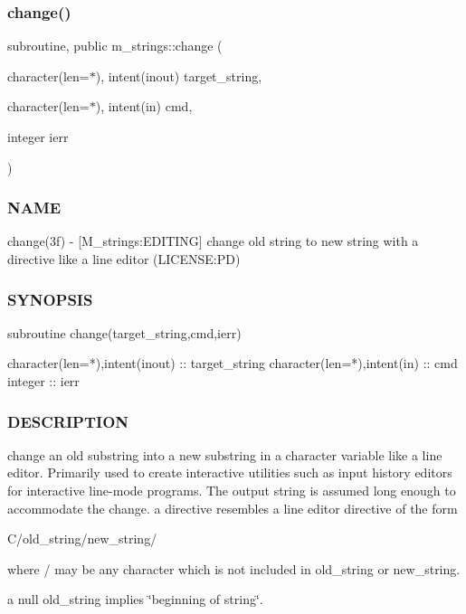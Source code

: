 \subsubsection{\texorpdfstring{change()}{change()}}
{\footnotesize\ttfamily subroutine, public m\+\_\+strings\+::change (\begin{DoxyParamCaption}\item[{character(len=$\ast$), intent(inout)}]{target\+\_\+string,  }\item[{character(len=$\ast$), intent(in)}]{cmd,  }\item[{integer}]{ierr }\end{DoxyParamCaption})}



\subsubsection*{N\+A\+ME}

change(3f) -\/ \mbox{[}M\+\_\+strings\+:E\+D\+I\+T\+I\+NG\mbox{]} change old string to new string with a directive like a line editor (L\+I\+C\+E\+N\+SE\+:PD) 

\subsubsection*{S\+Y\+N\+O\+P\+S\+IS}

\begin{DoxyVerb}subroutine change(target_string,cmd,ierr)

 character(len=*),intent(inout) :: target_string
 character(len=*),intent(in)    :: cmd
 integer                        :: ierr
\end{DoxyVerb}
 \subsubsection*{D\+E\+S\+C\+R\+I\+P\+T\+I\+ON}

change an old substring into a new substring in a character variable like a line editor. Primarily used to create interactive utilities such as input history editors for interactive line-\/mode programs. The output string is assumed long enough to accommodate the change. a directive resembles a line editor directive of the form

C/old\+\_\+string/new\+\_\+string/

where / may be any character which is not included in old\+\_\+string or new\+\_\+string.

a null old\+\_\+string implies \char`\"{}beginning of string\char`\"{}.

